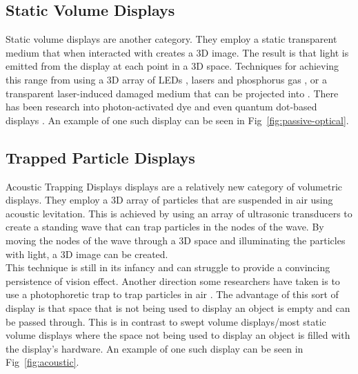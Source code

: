 \subsection{Static Volume Displays}
Static volume displays are another category. They employ a static transparent medium that when interacted with creates a 3D image. The result is that light is emitted from the display at each point in a 3D space. Techniques for achieving this range from using a 3D array of LEDs \cite{10.1145/2341931.2341937}, lasers and phosphorus gas \cite{https://doi.org/10.1002/anie.202003160}, or a transparent laser-induced damaged medium that can be projected into \cite{10.1145/1179849.1179982}. There has been research into photon-activated dye \cite{Patel2017} and even quantum dot-based displays \cite{Hirayama2015}. An example of one such display can be seen in Fig~\ref{fig:passive-optical}.

\subsection{Trapped Particle Displays}
Acoustic Trapping Displays displays are a relatively new category of volumetric displays. They employ a 3D array of particles that are suspended in air using acoustic levitation. \cite{10.1063/1.5113467} \cite{Hirayama2019} This is achieved by using an array of ultrasonic transducers to create a standing wave that can trap particles in the nodes of the wave. By moving the nodes of the wave through a 3D space and illuminating the particles with light, a 3D image can be created. \\

This technique is still in its infancy and can struggle to provide a convincing persistence of vision effect. Another direction some researchers have taken is to use a photophoretic trap to trap particles in air \cite{Smalley2018}. The advantage of this sort of display is that space that is not being used to display an object is empty and can be passed through. This is in contrast to swept volume displays/most static volume displays where the space not being used to display an object is filled with the display's hardware. An example of one such display can be seen in Fig~\ref{fig:acoustic}.

